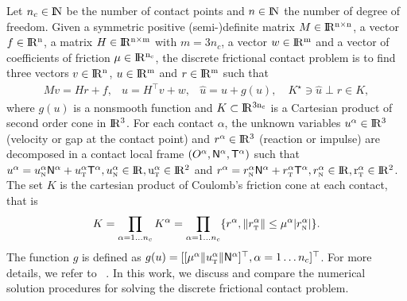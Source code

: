 \documentclass[11pt,a4paper]{article}
\newcommand{\RR}{\ensuremath{\rm I\!R}}
\newcommand{\NN}{\ensuremath{\rm I\!N}}
\def\n{{\hbox{\tiny{N}}}}
\def\t{{\hbox{\tiny{T}}}}
\begin{document}
  Let $n_c\in \NN$ be the number of contact points and $n\in\NN$ the number of degree of freedom. Given a symmetric positive (semi-)definite matrix ${M} \in \RR^{n \times n}$, a vector $ {f} \in \RR^n$, a matrix  ${H} \in \RR^{n \times m}$ with $m= 3n_c$, a vector $w \in \RR^{m}$ and a vector of coefficients of friction $\mu \in \RR^{n_c}$, the discrete frictional contact problem is to find three vectors $ {v} \in \RR^n$, $u\in\RR^m$ and $r\in \RR^m$ such that
\begin{equation}\label{eq:soccp1}
  \begin{array}{rcl}
    M v = {H} {r} + {f}, &
    u = H^\top v + w,  &
    \hat u = u + g(u), \quad 
                         K^\star \ni {\hat u} \perp r \in K,
  \end{array}
\end{equation}
where $g(u)$ is a nonsmooth function and $K\subset \RR^{3 n_c}$ is a Cartesian product of second order cone in $\RR^3$.   For each contact $\alpha$, the unknown variables  $u^\alpha\in\RR^3$ (velocity or gap at the contact point) and $r^\alpha\in\RR^3$ (reaction or impulse) are decomposed  in a contact local frame $(O^\alpha,{\sf N}^\alpha,{\sf T}^\alpha)$ such that $u^\alpha = u^\alpha_{\n} {\sf N}^\alpha +   u^{\alpha}_{\t}{\sf T}^\alpha, u^\alpha_{\n} \in \RR, u^\alpha_{\t} \in \RR^2$ and  $r^\alpha = r^\alpha_{\n} {\sf N}^\alpha +   r^{\alpha}_{\t}{\sf T}^\alpha, r^\alpha_{\n} \in \RR, r^\alpha_{\t} \in \RR^2$.
The set $K$ is the cartesian product of Coulomb's friction cone at each contact, that is
\begin{equation}
  \label{eq:CC}
  K = \prod_{\alpha=1\ldots n_c} K^{\alpha}  = \prod_{\alpha=1\ldots n_c} \{r^\alpha, \|r^\alpha_\t \| \leq \mu^\alpha |r^\alpha_\n| \}.
\end{equation}
The function $g$ is defined as $g(u) = [[\mu^\alpha  \|u^\alpha_\t\| {\sf N}^\alpha]^\top, \alpha = 1\ldots n_c]^\top$. For more details, we refer to ~\cite{Acary.Brogliato2008}.
In this work, we discuss and compare the numerical solution procedures for  solving the discrete frictional contact problem.
\end{document}
